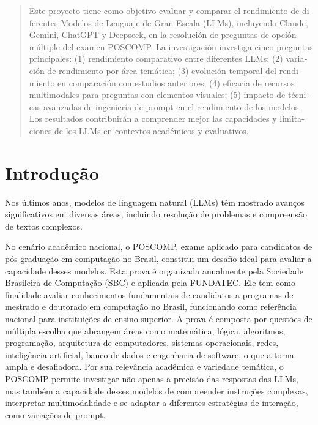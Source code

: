 \documentclass[brazilian, spanish, english]{RBIEarticle}
\begin{document}
\begin{otherlanguage}{spanish}
\begin{abstract}
Este proyecto tiene como objetivo evaluar y comparar el rendimiento de diferentes Modelos de Lenguaje de Gran Escala (LLMs), incluyendo Claude, Gemini, ChatGPT y Deepseek, en la resolución de preguntas de opción múltiple del examen POSCOMP. La investigación investiga cinco preguntas principales: (1) rendimiento comparativo entre diferentes LLMs; (2) variación de rendimiento por área temática; (3) evolución temporal del rendimiento en comparación con estudios anteriores; (4) eficacia de recursos multimodales para preguntas con elementos visuales; (5) impacto de técnicas avanzadas de ingeniería de prompt en el rendimiento de los modelos. Los resultados contribuirán a comprender mejor las capacidades y limitaciones de los LLMs en contextos académicos y evaluativos.
\end{abstract}
\end{otherlanguage}

\pagebreak

\section{Introdução}

Nos últimos anos, modelos de linguagem natural (LLMs) têm mostrado avanços significativos em diversas áreas, incluindo resolução de problemas e compreensão de textos complexos.

No cenário acadêmico nacional, o POSCOMP, exame aplicado para candidatos de pós-graduação em computação no Brasil, constitui um desafio ideal para avaliar a capacidade desses modelos. Esta prova é organizada anualmente pela Sociedade Brasileira de Computação (SBC) e aplicada pela FUNDATEC. Ele tem como finalidade avaliar conhecimentos fundamentais de candidatos a programas de mestrado e doutorado em computação no Brasil, funcionando como referência nacional para instituições de ensino superior. A prova é composta por questões de múltipla escolha que abrangem áreas como matemática, lógica, algoritmos, programação, arquitetura de computadores, sistemas operacionais, redes, inteligência artificial, banco de dados e engenharia de software, o que a torna ampla e desafiadora. Por sua relevância acadêmica e variedade temática, o POSCOMP permite investigar não apenas a precisão das respostas das LLMs, mas também a capacidade desses modelos de compreender instruções complexas, interpretar multimodalidade e se adaptar a diferentes estratégias de interação, como variações de prompt.
\end{document}
